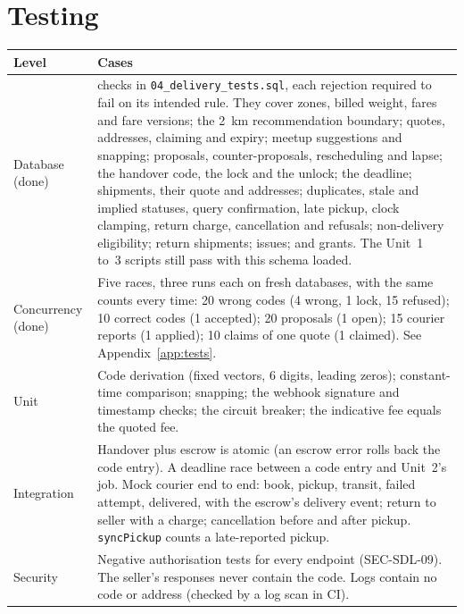 \documentclass[11pt,a4paper]{article}
\newenvironment{dtable}[1]{\small\begin{longtable}{#1}}{\end{longtable}}
\begin{document}
\section{Testing}
\label{sec:testing}
\begin{dtable}{@{}>{\raggedright\arraybackslash}p{3.2cm}>{\raggedright\arraybackslash}p{12cm}@{}}
\toprule
\textbf{Level} & \textbf{Cases} \\ \midrule \endhead
Database (done) & 93 checks in \texttt{04\_delivery\_tests.sql}, each rejection required to fail on its intended rule. They cover zones, billed weight, fares and fare versions; the 2~km recommendation boundary; quotes, addresses, claiming and expiry; meetup suggestions and snapping; proposals, counter-proposals, rescheduling and lapse; the handover code, the lock and the unlock; the deadline; shipments, their quote and addresses; duplicates, stale and implied statuses, query confirmation, late pickup, clock clamping, return charge, cancellation and refusals; non-delivery eligibility; return shipments; issues; and grants. The Unit~1 to~3 scripts still pass with this schema loaded. \\
Concurrency (done) & Five races, three runs each on fresh databases, with the same counts every time: 20 wrong codes (4 wrong, 1 lock, 15 refused); 10 correct codes (1 accepted); 20 proposals (1 open); 15 courier reports (1 applied); 10 claims of one quote (1 claimed). See Appendix~\ref{app:tests}. \\
Unit & Code derivation (fixed vectors, 6 digits, leading zeros); constant-time comparison; snapping; the webhook signature and timestamp checks; the circuit breaker; the indicative fee equals the quoted fee. \\
Integration & Handover plus escrow is atomic (an escrow error rolls back the code entry). A deadline race between a code entry and Unit~2's job. Mock courier end to end: book, pickup, transit, failed attempt, delivered, with the escrow's delivery event; return to seller with a charge; cancellation before and after pickup. \texttt{syncPickup} counts a late-reported pickup. \\
Security & Negative authorisation tests for every endpoint (SEC-SDL-09). The seller's responses never contain the code. Logs contain no code or address (checked by a log scan in CI). \\
\bottomrule
\end{dtable}
\end{document}
